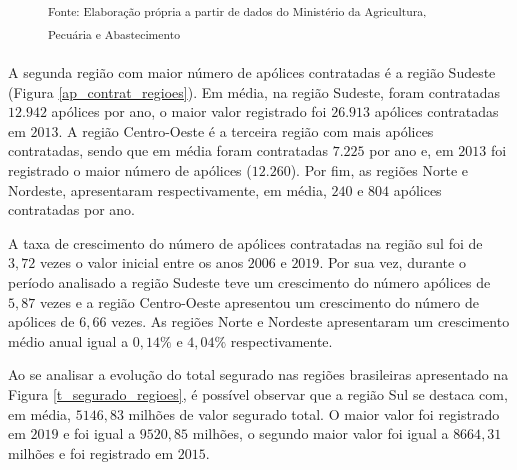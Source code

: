 \begin{figure}[H]
	\hspace{0.1cm}
	\\
	
    \parbox{\dimexpr\linewidth-2cm}{\raggedright
    \strut \textsuperscript{Fonte: Elaboração própria a partir de dados do Ministério da Agricultura, Pecuária e Abastecimento \cite{brasil21b}}\strut}
\end{figure}

A segunda região com maior número de apólices contratadas é a região Sudeste (Figura \ref{ap_contrat_regioes}). Em média, na região Sudeste, foram contratadas $12.942$ apólices por ano, o maior valor registrado foi $26.913$ apólices contratadas em $2013$. A região Centro-Oeste é a terceira região com mais apólices contratadas, sendo que em média foram contratadas $7.225$  por ano e, em $2013$ foi registrado o maior número de apólices ($12.260$). Por fim, as regiões Norte e Nordeste, apresentaram respectivamente, em média, $240$ e $804$ apólices contratadas por ano.

A taxa de crescimento do número de apólices contratadas na região sul foi de $3,72$ vezes o valor inicial entre os anos $2006$ e $2019$. Por sua vez, durante o período analisado a região Sudeste teve um crescimento do número apólices de $5,87$ vezes e a região Centro-Oeste apresentou um crescimento do número de apólices de $6,66$ vezes. As regiões Norte e Nordeste apresentaram um crescimento médio anual igual a $0,14\%$ e $4,04\%$ respectivamente. 

Ao se analisar a evolução do total segurado nas regiões brasileiras apresentado na Figura \ref{t_segurado_regioes}, é possível observar que a região Sul se destaca com, em média, $5146,83$ milhões de valor segurado total. O maior valor foi registrado em $2019$ e foi igual a $9520,85$ milhões, o segundo maior valor foi igual a $8664,31$ milhões e foi registrado em $2015$. 

